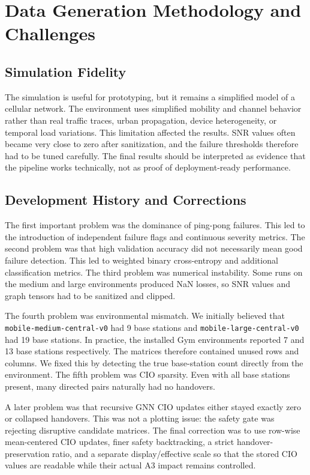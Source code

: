 \documentclass[11pt,a4paper]{article}
\begin{document}
\section{Data Generation Methodology and Challenges}
\label{sec:data_generation}

\subsection{Simulation Fidelity}
The simulation is useful for prototyping, but it remains a simplified model of a cellular network. The environment uses simplified mobility and channel behavior rather than real traffic traces, urban propagation, device heterogeneity, or temporal load variations. This limitation affected the results. SNR values often became very close to zero after sanitization, and the failure thresholds therefore had to be tuned carefully. The final results should be interpreted as evidence that the pipeline works technically, not as proof of deployment-ready performance.

\subsection{Development History and Corrections}
The first important problem was the dominance of ping-pong failures. This led to the introduction of independent failure flags and continuous severity metrics. The second problem was that high validation accuracy did not necessarily mean good failure detection. This led to weighted binary cross-entropy and additional classification metrics. The third problem was numerical instability. Some runs on the medium and large environments produced NaN losses, so SNR values and graph tensors had to be sanitized and clipped.

The fourth problem was environmental mismatch. We initially believed that \texttt{mobile-medium-central-v0} had 9 base stations and \texttt{mobile-large-central-v0} had 19 base stations. In practice, the installed Gym environments reported 7 and 13 base stations respectively. The matrices therefore contained unused rows and columns. We fixed this by detecting the true base-station count directly from the environment. The fifth problem was CIO sparsity. Even with all base stations present, many directed pairs naturally had no handovers.

A later problem was that recursive GNN CIO updates either stayed exactly zero or collapsed handovers. This was not a plotting issue: the safety gate was rejecting disruptive candidate matrices. The final correction was to use row-wise mean-centered CIO updates, finer safety backtracking, a strict handover-preservation ratio, and a separate display/effective scale so that the stored CIO values are readable while their actual A3 impact remains controlled.
\end{document}
